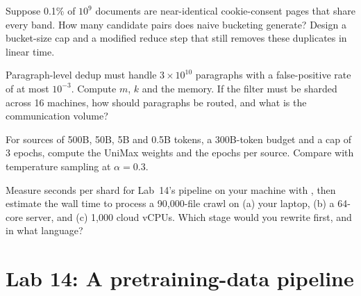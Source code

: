 \begin{exercise}
Suppose 0.1\% of $10^{9}$ documents are near-identical cookie-consent pages that share every band.
How many candidate pairs does naive bucketing generate? Design a bucket-size cap and a
modified reduce step that still removes these duplicates in linear time.
\end{exercise}

\begin{exercise}
Paragraph-level dedup must handle $3\times10^{10}$ paragraphs with a false-positive rate of at most
$10^{-3}$. Compute $m$, $k$ and the memory. If the filter must be sharded across 16 machines,
how should paragraphs be routed, and what is the communication volume?
\end{exercise}

\begin{exercise}
For sources of 500B, 50B, 5B and 0.5B tokens, a 300B-token budget and a cap of 3 epochs, compute
the UniMax weights and the epochs per source. Compare with temperature sampling at $\alpha=0.3$.
\end{exercise}

\begin{exercise}
Measure seconds per shard for Lab~14's pipeline on your machine with , then
estimate the wall time to process a 90{,}000-file crawl on (a) your laptop, (b) a 64-core server,
and (c) 1{,}000 cloud vCPUs. Which stage would you rewrite first, and in what language?
\end{exercise}

\section{Lab 14: A pretraining-data pipeline}\label{sec:data:lab}

